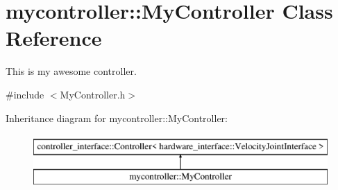 \hypertarget{classmycontroller_1_1MyController}{\section{mycontroller\-:\-:My\-Controller Class Reference}
\label{classmycontroller_1_1MyController}
}


This is my awesome controller.  




{\ttfamily \#include $<$My\-Controller.\-h$>$}

Inheritance diagram for mycontroller\-:\-:My\-Controller\-:\begin{figure}[H]
\begin{center}
\leavevmode
\includegraphics[height=2.000000cm]{classmycontroller_1_1MyController}
\end{center}
\end{figure}
